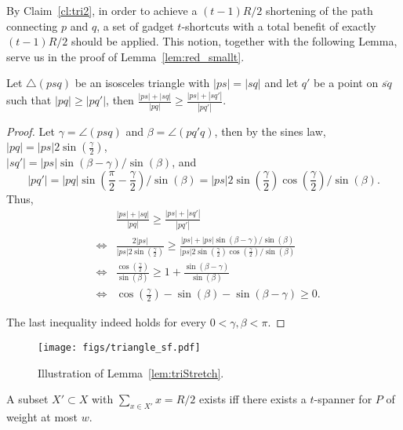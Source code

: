 \documentclass[a4paper]{llncs}
\begin{document}
By Claim~\ref{cl:tri2}, in order to achieve a $(t-1)R/2$ shortening 
of the path connecting $p$ and $q$,
a set of gadget $t$-shortcuts 
with a total benefit of exactly $(t-1)R/2$ should be applied.
This notion, together with the following Lemma, 
serve us in the proof of Lemma~\ref{lem:red_smallt}.



\begin{lemma}\label{lem:triStretch}
Let $\triangle(psq)$ be an isosceles triangle with $|ps|=|sq|$ 
and let $q'$ be a point on $\overline{sq}$ such that $|pq| \geq |pq'|$,
then $\frac{|ps|+|sq|}{|pq|} \geq \frac{|ps|+|sq'|}{|pq'|}$.
\end{lemma}

\begin{proof}
Let $\gamma = \angle(psq)$ and $\beta = \angle(pq'q)$,
then by the sines law, $|pq|=|ps|2\sin(\frac{\gamma}{2})$, \\
$|sq'|=|ps|\sin(\beta-\gamma)/\sin(\beta)$, and
$$|pq'|= |pq|\sin(\frac{\pi}{2}-\frac{\gamma}{2})/\sin(\beta)=
|ps|2\sin(\frac{\gamma}{2})\cos(\frac{\gamma}{2})/\sin(\beta).$$
Thus, 
\begin{eqnarray*}
 && \frac{|ps|+|sq|}{|pq|} \geq \frac{|ps|+|sq'|}{|pq'|}\\
 &\Leftrightarrow& \frac{2|ps|}{|ps|2\sin(\frac{\gamma}{2})} \geq 
 										\frac{|ps|+|ps|\sin(\beta-\gamma)/\sin(\beta)}{|ps|2\sin(\frac{\gamma}{2})\cos(\frac{\gamma}{2})/\sin(\beta)}\\
 &\Leftrightarrow& \frac{\cos(\frac{\gamma}{2})}{\sin(\beta)} \geq 
 										1+\frac{\sin(\beta-\gamma)}{\sin(\beta)}\\
 &\Leftrightarrow& 	\cos(\frac{\gamma}{2}) -	\sin(\beta) -	\sin(\beta-\gamma)	\geq 0.
\end{eqnarray*}

The last inequality indeed holds for every $0<\gamma,\beta<\pi$.
\end{proof}


\begin{figure}[htb]
    \centering
        \texttt{[image: figs/triangle\_sf.pdf]}
    \caption{Illustration of Lemma~\ref{lem:triStretch}.}
    \label{fig:triangle_sf}
\end{figure}




\begin{lemma}\label{lem:red_smallt}
A subset $X'\subset X$ with $\sum_{x \in X'} x =R/2$ exists 
iff there exists a $t$-spanner for $P$ of weight at most $w$.
\end{lemma} 
\end{document}
